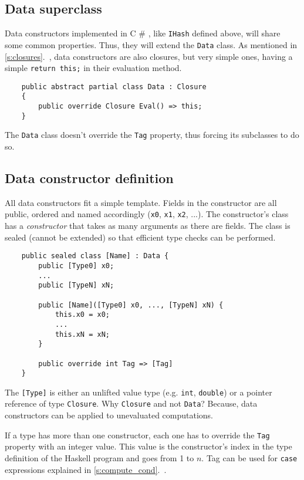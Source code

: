 \documentclass[en]{pracamgr}
\newcommand{\shrp}{%
  {\fontfamily{ppl}\selectfont\#%
  }}
\newcommand{\myref}[1]{\ref{#1}.~\textit{\nameref{#1}}}
\begin{document}
\subsection{Data superclass}

Data constructors implemented in C\shrp{}, like \texttt{IHash} defined above,
will share some common properties. Thus, they will extend the \texttt{Data} class.
As mentioned in \myref{s:closures}, data constructors are
also closures, but very simple ones, having a simple
\texttt{return this;} in their evaluation method.

\begin{verbatim}
    public abstract partial class Data : Closure
    {
        public override Closure Eval() => this;
    }
\end{verbatim}

The \texttt{Data} class doesn't override the \texttt{Tag}
property, thus forcing its subclasses to do so.

\subsection{Data constructor definition}

All data constructors fit a simple template.
Fields in the constructor are all public, ordered and named accordingly
(\texttt{x0}, \texttt{x1}, \texttt{x2}, ...).
The constructor's class has a \textit{constructor} that takes
as many arguments as there are fields.
The class is sealed (cannot be extended) so that efficient
type checks can be performed.

\begin{verbatim}
    public sealed class [Name] : Data {
        public [Type0] x0;
        ...
        public [TypeN] xN;

        public [Name]([Type0] x0, ..., [TypeN] xN) {
            this.x0 = x0;
            ...
            this.xN = xN;
        }

        public override int Tag => [Tag]
    }
\end{verbatim}

The \verb|[Type]| is either an unlifted value type
(e.g. \texttt{int}, \texttt{double}) or a pointer reference
of type \texttt{Closure}. Why \texttt{Closure} and not \texttt{Data}?
Because, data constructors can be applied to unevaluated computations.

If a type has more than one constructor, each one has to
override the \texttt{Tag} property with an integer value.
This value is the constructor's index in the type definition of
the Haskell program and goes from 1 to $n$.
Tag can be used for \texttt{case} expressions explained in \myref{s:compute_cond}.
\end{document}
